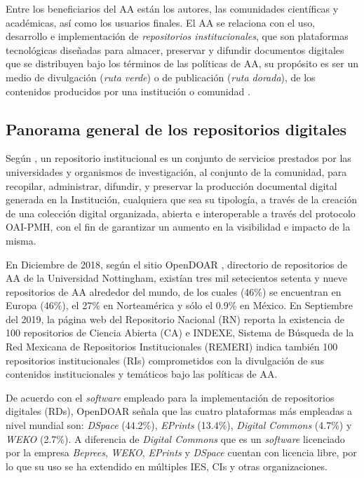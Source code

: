 Entre los beneficiarios del AA est\'an los autores, las comunidades cient\'ificas y acad\'emicas, as\'i como los usuarios finales. El AA se relaciona con el uso, desarrollo e implementaci\'on de \emph{repositorios institucionales}, que son plataformas tecnol\'ogicas dise\~{n}adas para almacer, preservar y difundir documentos digitales que se distribuyen bajo los t\'erminos de las pol\'iticas de AA, su prop\'osito es ser un medio de divulgaci\'on (\textit{ruta verde}) o de publicaci\'on (\textit{ruta dorada}), de los contenidos producidos por una instituci\'on o comunidad \cite{RutaVerdeDorada}.
\subsection{Panorama general de los repositorios digitales}


Según \cite{EcosistemasdelAA}, un repositorio institucional es un conjunto de servicios prestados por las universidades y organismos de investigación, al conjunto de la comunidad, para recopilar, administrar, difundir, y preservar la producción documental digital generada en la Institución, cualquiera que sea su tipología, a través de la creación de una colección digital organizada, abierta e interoperable a través del protocolo OAI-PMH, con el fin de garantizar un aumento en la visibilidad e impacto de la misma.\newline

En Diciembre de 2018, seg\'un el sitio OpenDOAR \cite{OpenDOAR}, directorio de repositorios de AA de la Universidad Nottingham, exist\'ian tres mil setecientos setenta y nueve repositorios de AA alrededor del mundo, de los cuales (46\%) se encuentran en Europa (46\%), el 27\% en Norteam\'erica y s\'olo el 0.9\% en M\'exico. En Septiembre del 2019, la p\'agina web del Repositorio Nacional (RN) \cite{RepositorioNacional} reporta la existencia de 100 repositorios de Ciencia Abierta (CA) e INDEXE, Sistema de B\'usqueda de la Red Mexicana de Repositorios Institucionales (REMERI) \cite{RI_REMERI} indica tambi\'en 100 repositorios institucionales (RIs) comprometidos con la divulgaci\'on de sus contenidos institucionales y tem\'aticos bajo las pol\'iticas de AA.\newline

De acuerdo con el \textit{software} empleado para la implementaci\'on de repositorios digitales (RDs), OpenDOAR \cite{OpenDOAR} se\~{n}ala que las cuatro plataformas m\'as empleadas a nivel mundial son: \textit{DSpace} \cite{DSpaceRef} (44.2\%), \textit{EPrints} (13.4\%), \textit{Digital Commons} (4.7\%) y \textit{WEKO} (2.7\%). A diferencia de \textit{Digital Commons} que es un \textit{software} licenciado por la empresa \textit{Beprees}, \textit{WEKO}, \textit{EPrints} y \textit{DSpace} cuentan con licencia libre, por lo que su uso se ha extendido en m\'ultiples IES, CIs y otras organizaciones.\newline

